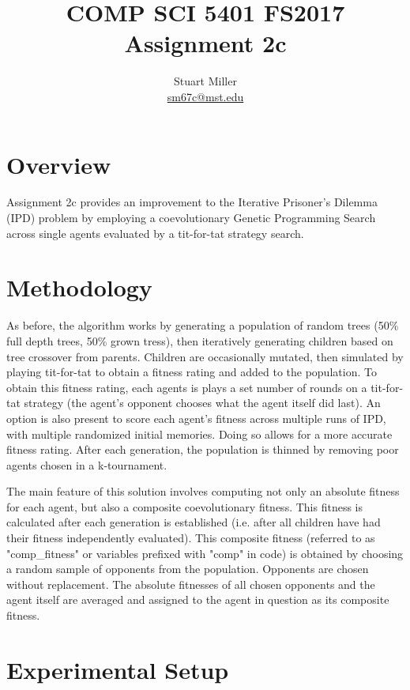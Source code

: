 \documentclass[11pt]{article}
\begin{document}
\title{COMP SCI 5401 FS2017 Assignment 2c}
\author{Stuart Miller\\\href{mailto:sm67c@mst.edu}{sm67c@mst.edu}}
\maketitle


\section{Overview}\label{sect:overview}

Assignment 2c provides an improvement to the Iterative Prisoner's Dilemma (IPD) problem by employing a coevolutionary Genetic Programming Search across single agents evaluated by a tit-for-tat strategy search. 


\section{Methodology}\label{sect:methodology}
As before, the algorithm works by generating a population of random trees (50\% full depth trees, 50\% grown tress), then iteratively generating children based on tree crossover from parents. Children are occasionally mutated, then simulated by playing tit-for-tat to obtain a fitness rating and added to the population. To obtain this fitness rating, each agents is plays a set number of rounds on a tit-for-tat strategy (the agent's opponent chooses what the agent itself did last). An option is also present to score each agent's fitness across multiple runs of IPD, with multiple randomized initial memories. Doing so allows for a more accurate fitness rating. After each generation, the population is thinned by removing poor agents chosen in a k-tournament. 

The main feature of this solution involves computing not only an absolute fitness for each agent, but also a composite coevolutionary fitness. This fitness is calculated after each generation is established (i.e. after all children have had their fitness independently evaluated). This composite fitness (referred to as "comp\_fitness" or variables prefixed with "comp" in code) is obtained by choosing a random sample of opponents from the population. Opponents are chosen without replacement. The absolute fitnesses of all chosen opponents and the agent itself are averaged and assigned to the agent in question as its composite fitness.

\section{Experimental Setup}\label{sect:exp_setup}
\end{document}
